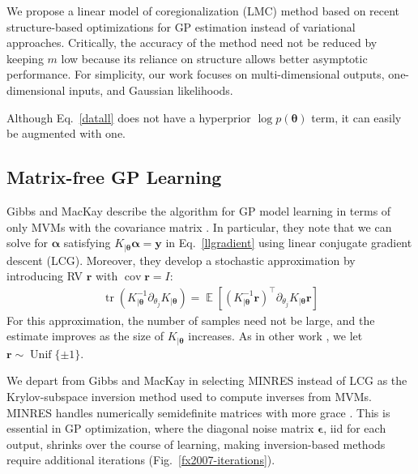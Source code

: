 \documentclass{article}
\def\bsa{{\boldsymbol\alpha}}
\def\bse{{\boldsymbol\epsilon}}
\def\bsth{{\boldsymbol\theta}}
\newcommand{\pa}[1]{ \left({#1}\right) }
\def\Ty{\textbf{y}}
\def\tbr{\textbf{r}}
\DeclareMathOperator\cov{cov}
\DeclareMathOperator\Unif{Unif}
\DeclareMathOperator\mathExp{\mathbb{E}}
\def \E {\mathExp}
\DeclareMathOperator{\Tr}{tr}
\begin{document}
We propose a linear model of coregionalization (LMC) method based on recent structure-based optimizations for GP estimation instead of variational approaches. Critically, the accuracy of the method need not be reduced by keeping $m$ low because its reliance on structure allows better asymptotic performance.
For simplicity, our work focuses on multi-dimensional outputs, one-dimensional inputs, and Gaussian likelihoods.

Although Eq.~\ref{datall} does not have a hyperprior $\log p(\bsth)$ term, it can easily be augmented with one.

\subsection{Matrix-free GP Learning}

Gibbs and MacKay describe the algorithm for GP model learning in terms of only MVMs with the covariance matrix . In particular, they note that we can solve for $\bsa$ satisfying $K_{|\bsth}\bsa=\Ty$ in Eq.~\ref{llgradient} using linear conjugate gradient descent (LCG). Moreover, they develop a stochastic approximation by introducing RV $\tbr$ with $\cov \tbr=I$:
\begin{align}
  \Tr\pa{K_{|\bsth}^{-1}\partial_{\theta_j}K_{|\bsth}} = \E\left[(K_{|\bsth}^{-1}\tbr)^\top\partial_{\theta_j}K_{|\bsth}\tbr\right]\label{eq:trace}
\end{align}
For this approximation, the number of samples need not be large, and the estimate improves as the size of $K_{|\bsth}$ increases.
As in other work \cite{cutajar2016preconditioning}, we let $\tbr\sim\Unif\{\pm 1\}$.

We depart from Gibbs and MacKay in selecting MINRES instead of LCG as the Krylov-subspace inversion method used to compute inverses from MVMs. MINRES handles numerically semidefinite matrices with more grace \cite{fong2012cg}. This is essential in GP optimization, where the diagonal noise matrix $\bse$, iid for each output, shrinks over the course of learning, making inversion-based methods require additional iterations (Fig.~\ref{fx2007-iterations}).
\end{document}
